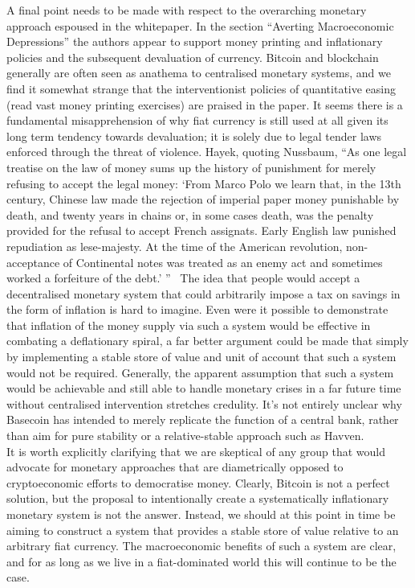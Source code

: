\noindent A final point needs to be made with respect to the overarching monetary approach espoused in the whitepaper. In the section ``Averting Macroeconomic Depressions'' the authors appear to support money printing and inflationary policies and the subsequent devaluation of currency. Bitcoin and blockchain generally are often seen as anathema to centralised monetary systems, and we find it somewhat strange that the interventionist policies of quantitative easing (read vast money printing exercises) are praised in the paper. It seems there is a fundamental misapprehension of why fiat currency is still used at all given its long term tendency towards devaluation; it is solely due to legal tender laws enforced through the threat of violence. Hayek, quoting Nussbaum, ``As one legal treatise on the law of money sums up the history of punishment for merely refusing to accept the legal money: `From Marco Polo we learn that, in the 13th century, Chinese law made the rejection of imperial paper money punishable by death, and twenty years in chains or, in some cases death, was the penalty provided for the refusal to accept French assignats. Early English law punished repudiation as lese-majesty. At the time of the American revolution, non-acceptance of Continental notes was treated as an enemy act and sometimes worked a forfeiture of the debt.' ''~\cite{hayek1976denationalisation} The idea that people would accept a decentralised monetary system that could arbitrarily impose a tax on savings in the form of inflation is hard to imagine. Even were it possible to demonstrate that inflation of the money supply via such a system would be effective in combating a deflationary spiral, a far better argument could be made that simply by implementing a stable store of value and unit of account that such a system would not be required. Generally, the apparent assumption that such a system would be achievable and still able to handle monetary crises in a far future time without centralised intervention stretches credulity. It's not entirely unclear why Basecoin has intended to merely replicate the function of a central bank, rather than aim for pure stability or a relative-stable approach such as Havven. \\

\noindent It is worth explicitly clarifying that we are skeptical of any group that would advocate for monetary approaches that are diametrically opposed to cryptoeconomic efforts to democratise money. Clearly, Bitcoin is not a perfect solution, but the proposal to intentionally create a systematically inflationary monetary system is not the answer. Instead, we should at this point in time be aiming to construct a system that provides a stable store of value relative to an arbitrary fiat currency. The macroeconomic benefits of such a system are clear, and for as long as we live in a fiat-dominated world this will continue to be the case.

